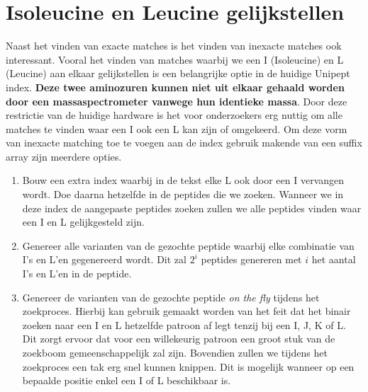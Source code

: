 \section{Isoleucine en Leucine gelijkstellen}\label{sec:isoleucine-en-leucine-equivalentie}
Naast het vinden van exacte matches is het vinden van inexacte matches ook interessant.
Vooral het vinden van matches waarbij we een I (Isoleucine) en L (Leucine) aan elkaar gelijkstellen is een belangrijke optie in de huidige Unipept index.
\textbf{Deze twee aminozuren kunnen niet uit elkaar gehaald worden door een massaspectrometer vanwege hun identieke massa}.
Door deze restrictie van de huidige hardware is het voor onderzoekers erg nuttig om alle matches te vinden waar een I ook een L kan zijn of omgekeerd.
Om deze vorm van inexacte matching toe te voegen aan de index gebruik makende van een suffix array zijn meerdere opties.
\begin{enumerate}
    \item Bouw een extra index waarbij in de tekst elke L ook door een I vervangen wordt.
    Doe daarna hetzelfde in de peptides die we zoeken.
    Wanneer we in deze index de aangepaste peptides zoeken zullen we alle peptides vinden waar een I en L gelijkgesteld zijn.
    \item Genereer alle varianten van de gezochte peptide waarbij elke combinatie van I's en L'en gegenereerd wordt.
    Dit zal $2^i$ peptides genereren met $i$ het aantal I's en L'en in de peptide.
    \item Genereer de varianten van de gezochte peptide \textit{on the fly} tijdens het zoekproces.
    Hierbij kan gebruik gemaakt worden van het feit dat het binair zoeken naar een I en L hetzelfde patroon af legt tenzij bij een I, J, K of L\@.
    Dit zorgt ervoor dat voor een willekeurig patroon een groot stuk van de zoekboom gemeenschappelijk zal zijn.
    Bovendien zullen we tijdens het zoekproces een tak erg snel kunnen knippen.
    Dit is mogelijk wanneer op een bepaalde positie enkel een I of L beschikbaar is.
\end{enumerate}

